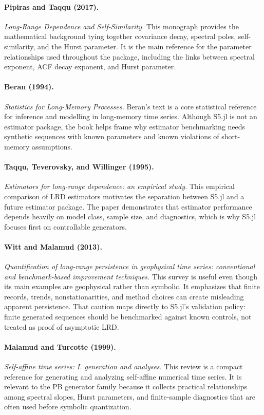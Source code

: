 \documentclass[11pt]{article}
\begin{document}
\paragraph{Pipiras and Taqqu (2017).}
\emph{Long-Range Dependence and Self-Similarity.}
This monograph provides the mathematical background tying together covariance
decay, spectral poles, self-similarity, and the Hurst parameter. It is the main
reference for the parameter relationships used throughout the package, including
the links between spectral exponent, ACF decay exponent, and Hurst parameter.

\paragraph{Beran (1994).}
\emph{Statistics for Long-Memory Processes.}
Beran's text is a core statistical reference for inference and modelling in
long-memory time series. Although S5.jl is not an estimator package, the book
helps frame why estimator benchmarking needs synthetic sequences with known
parameters and known violations of short-memory assumptions.

\paragraph{Taqqu, Teverovsky, and Willinger (1995).}
\emph{Estimators for long-range dependence: an empirical study.}
This empirical comparison of LRD estimators motivates the separation between
S5.jl and a future estimator package. The paper demonstrates that estimator
performance depends heavily on model class, sample size, and diagnostics, which
is why S5.jl focuses first on controllable generators.

\paragraph{Witt and Malamud (2013).}
\emph{Quantification of long-range persistence in geophysical time series:
conventional and benchmark-based improvement techniques.}
This survey is useful even though its main examples are geophysical rather than
symbolic. It emphasizes that finite records, trends, nonstationarities, and
method choices can create misleading apparent persistence. That caution maps
directly to S5.jl's validation policy: finite generated sequences should be
benchmarked against known controls, not treated as proof of asymptotic LRD.

\paragraph{Malamud and Turcotte (1999).}
\emph{Self-affine time series: I. generation and analyses.}
This review is a compact reference for generating and analyzing self-affine
numerical time series. It is relevant to the PB generator family because it
collects practical relationships among spectral slopes, Hurst parameters, and
finite-sample diagnostics that are often used before symbolic quantization.
\end{document}
